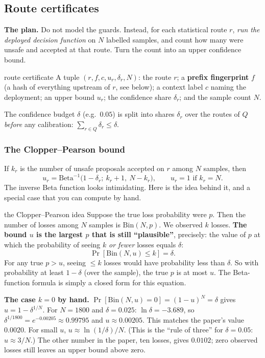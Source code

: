 \subsection{Route certificates}

\textbf{The plan.} Do not model the guards. Instead, for each statistical route $r$, \emph{run the deployed decision function} on $N$ labelled samples, and count how many were unsafe and accepted at that route. Turn the count into an upper confidence bound.

\begin{defbox}{route certificate}
A tuple $(r,f,c,u_r,\delta_r,N)$: the route $r$; a \textbf{prefix fingerprint} $f$ (a hash of everything upstream of $r$, see below); a context label $c$ naming the deployment; an upper bound $u_r$; the confidence share $\delta_r$; and the sample count $N$.
\end{defbox}

The confidence budget $\delta$ (e.g.\ $0.05$) is split into shares $\delta_r$ over the routes of $Q$ \emph{before} any calibration: $\sum_{r\in Q}\delta_r\le\delta$.

\subsubsection{The Clopper--Pearson bound}

If $k_r$ is the number of unsafe proposals accepted on $r$ among $N$ samples, then
\[
u_r=\mathrm{Beta}^{-1}\bigl(1-\delta_r;\ k_r+1,\ N-k_r\bigr),\qquad u_r=1\text{ if }k_r=N.
\]
The inverse Beta function looks intimidating. Here is the idea behind it, and a special case that you can compute by hand.

\begin{toolbox}{the Clopper--Pearson idea}
Suppose the true loss probability were $p$. Then the number of losses among $N$ samples is $\mathrm{Bin}(N,p)$. We observed $k$ losses. \textbf{The bound $u$ is the largest $p$ that is still ``plausible''}, precisely: the value of $p$ at which the probability of seeing $k$ \emph{or fewer} losses equals $\delta$:
\[
\Pr[\mathrm{Bin}(N,u)\le k]=\delta.
\]
For any true $p>u$, seeing $\le k$ losses would have probability less than $\delta$. So with probability at least $1-\delta$ (over the sample), the true $p$ is at most $u$. The Beta-function formula is simply a closed form for this equation.

\smallskip
\textbf{The case $k=0$ by hand.} $\Pr[\mathrm{Bin}(N,u)=0]=(1-u)^N=\delta$ gives $u=1-\delta^{1/N}$. For $N=1800$ and $\delta=0.025$: $\ln\delta=-3.689$, so $\delta^{1/1800}=e^{-0.00205}\approx0.99795$ and $u\approx0.00205$. This matches the paper's value $0.0020$. For small $u$, $u\approx\ln(1/\delta)/N$. (This is the ``rule of three'' for $\delta=0.05$: $u\approx3/N$.) The other number in the paper, ten losses, gives $0.0102$; zero observed losses still leaves an upper bound above zero.
\end{toolbox}

